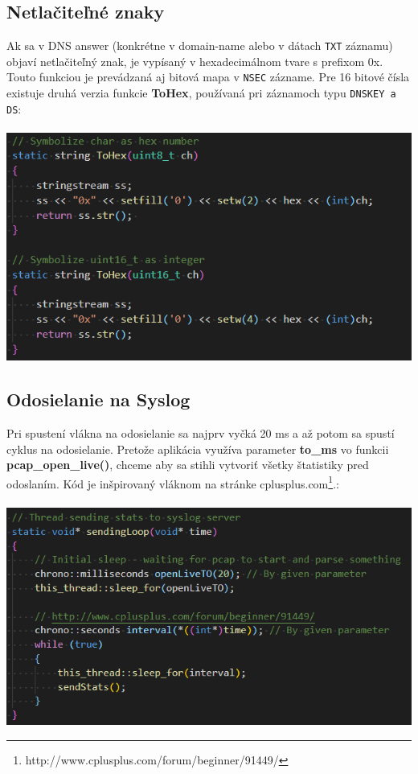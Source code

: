 \documentclass{article}
\begin{document}
        \subsection{Netlačiteľné znaky}
        Ak sa v DNS answer (konkrétne v domain-name alebo v dátach \texttt{TXT} záznamu) objaví netlačiteľný znak, je vypísaný v hexadecimálnom tvare s prefixom 0x. Touto funkciou
        je prevádzaná aj bitová mapa v \texttt{NSEC} zázname. Pre 16 bitové čísla existuje druhá verzia funkcie \textbf{ToHex}, používaná pri záznamoch typu \texttt{DNSKEY a DS}:\\\\
        \includegraphics[scale=0.6]{tohex.png}

        \newpage

        \subsection{Odosielanie na Syslog}
        Pri spustení vlákna na odosielanie sa najprv vyčká 20 ms a až potom sa spustí cyklus na odosielanie. Pretože aplikácia využíva parameter \textbf{to\_ms}
        vo funkcii \textbf{pcap\_open\_live()}, chceme aby sa stihli vytvoriť všetky štatistiky pred odoslaním. Kód je inšpirovaný vláknom na stránke
        cplusplus.com\footnote{http://www.cplusplus.com/forum/beginner/91449/}.:\\\\
        \includegraphics[scale=0.6]{loop.png}
\end{document}
